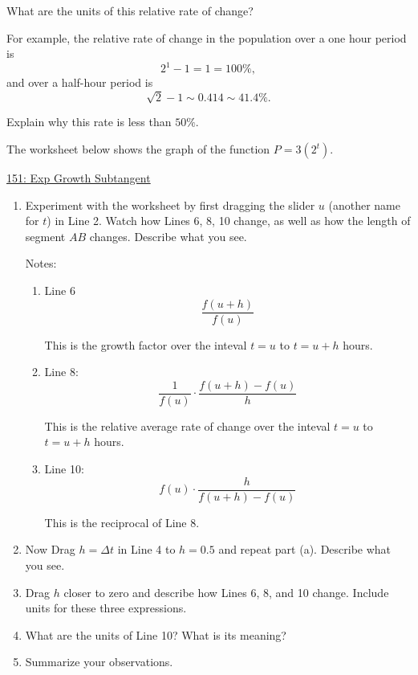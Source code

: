 \documentclass{ximera}
\begin{document}
\begin{question} \label{QODFERerre}
What are the units of this relative rate of change?
\end{question}

For example, the relative rate of change in the population over a one hour period is
\[ 
        2^1 - 1 = 1 = 100\%,
\]
and over a half-hour period is
\[
    \sqrt{2} - 1 \sim 0.414 \sim 41.4\%.
\]

\begin{question} \label{QERdftrre}
Explain why this rate is less than $50\%$.
\end{question}

\begin{exploration} \label{EKDFeredfM}
The worksheet below shows the graph of the function $P=3(2^t)$. 

\href{https://www.desmos.com/calculator/zu0f4jnh4a}{151: Exp Growth Subtangent}

 
\begin{onlineOnly}
    \begin{center}
\end{center}
\end{onlineOnly}


\begin{enumerate}
\item Experiment with the worksheet by first dragging the slider $u$ (another name for $t$) in Line 2. Watch how Lines 6, 8, 10 change, as well as how the length of segment $AB$ changes. Describe what you see.

Notes:

\begin{enumerate}
\item Line 6
\[
\frac{f(u+h)}{f(u)}
\]

This is the growth factor over the inteval $t=u$ to $t=u+h$ hours.

\item Line 8: 
\[
    \frac{1}{f(u)}\cdot \frac{f(u+h)-f(u)}{h}
\]

This is the relative average rate of change over the inteval $t=u$ to $t=u+h$ hours.

\item Line 10:
\[
    f(u) \cdot \frac{h}{f(u+h)-f(u)}
\]

This is the reciprocal of Line 8.
\end{enumerate}


\item Now Drag $h=\Delta t$ in Line 4 to $h=0.5$ and repeat part (a). Describe what you see.

\item Drag $h$ closer to zero and describe how Lines 6, 8, and 10 change. Include units for these three expressions.

\item What are the units of Line 10? What is its meaning?

\item Summarize your observations.

\end{enumerate}
\end{exploration}
\end{document}
